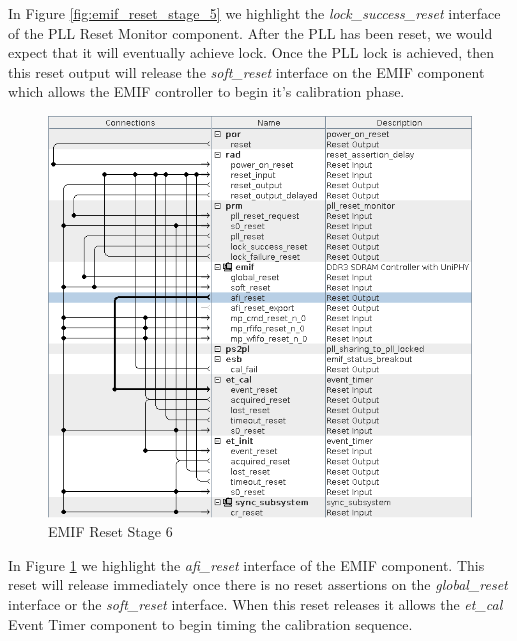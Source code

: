 \documentclass{article}
\begin{document}
\begin{flushleft}
In Figure \ref{fig:emif_reset_stage_5} we highlight the \emph{lock\_success\_reset} interface of the PLL Reset Monitor component.  After the PLL has been reset, we would expect that it will eventually achieve lock.  Once the PLL lock is achieved, then this reset output will release the \emph{soft\_reset} interface on the EMIF component which allows the EMIF controller to begin it's calibration phase.

\begin{figure}[H]
\centering
\includegraphics[scale=0.675]{emif_reset_stage_6}
\caption{EMIF Reset Stage 6}
\label{fig:emif_reset_stage_6}
\end{figure}

In Figure \ref{fig:emif_reset_stage_6} we highlight the \emph{afi\_reset} interface of the EMIF component.  This reset will release immediately once there is no reset assertions on the \emph{global\_reset} interface or the \emph{soft\_reset} interface.  When this reset releases it allows the \emph{et\_cal} Event Timer component to begin timing the calibration sequence.


\end{flushleft}
\end{document}
